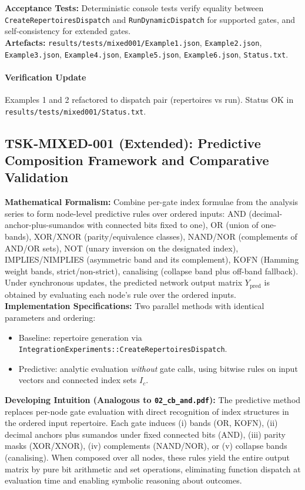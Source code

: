 \documentclass{article}
\begin{document}
\textbf{Acceptance Tests:} Deterministic console tests verify equality between \texttt{CreateRepertoiresDispatch} and \texttt{RunDynamicDispatch} for supported gates, and self-consistency for extended gates.\\
\textbf{Artefacts:} \texttt{results/tests/mixed001/Example1.json}, \texttt{Example2.json}, \texttt{Example3.json}, \texttt{Example4.json}, \texttt{Example5.json}, \texttt{Example6.json}, \texttt{Status.txt}.\\
\paragraph{Verification Update} Examples 1 and 2 refactored to dispatch pair (repertoires vs run). Status OK in \texttt{results/tests/mixed001/Status.txt}.
\subsection{TSK-MIXED-001 (Extended): Predictive Composition Framework and Comparative Validation}
\textbf{Mathematical Formalism:} Combine per-gate index formulae from the analysis series to form node-level predictive rules over ordered inputs: AND (decimal-anchor-plus-sumandos with connected bits fixed to one), OR (union of one-bands), XOR/XNOR (parity/equivalence classes), NAND/NOR (complements of AND/OR sets), NOT (unary inversion on the designated index), IMPLIES/NIMPLIES (asymmetric band and its complement), KOFN (Hamming weight bands, strict/non-strict), canalising (collapse band plus off-band fallback). Under synchronous updates, the predicted network output matrix \(Y_{\mathrm{pred}}\) is obtained by evaluating each node’s rule over the ordered inputs.\\
\textbf{Implementation Specifications:} Two parallel methods with identical parameters and ordering:
\begin{itemize}
 \item Baseline: repertoire generation via \texttt{Integration\textasciigrave Experiments::CreateRepertoiresDispatch}.
 \item Predictive: analytic evaluation \textit{without} gate calls, using bitwise rules on input vectors and connected index sets \(I_c\).
\end{itemize}
\textbf{Developing Intuition (Analogous to \texttt{02\_cb\_and.pdf}):} The predictive method replaces per-node gate evaluation with direct recognition of index structures in the ordered input repertoire. Each gate induces (i) bands (OR, KOFN), (ii) decimal anchors plus sumandos under fixed connected bits (AND), (iii) parity masks (XOR/XNOR), (iv) complements (NAND/NOR), or (v) collapse bands (canalising). When composed over all nodes, these rules yield the entire output matrix by pure bit arithmetic and set operations, eliminating function dispatch at evaluation time and enabling symbolic reasoning about outcomes.\\
\end{document}
